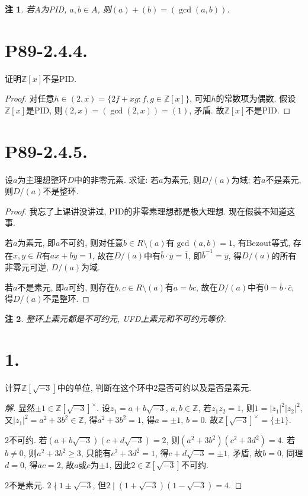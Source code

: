\documentclass[12pt, a4paper, fontset=windows]{ctexart}
\newcommand{\Z}{\mathbb{Z}}
\newcommand{\abs}[1]{\left|{#1}\right|}
\newcommand{\cl}[1]{\overline{#1}} %
\newcommand{\unit}[1]{{#1}^\times}
\newtheorem*{remark}{注}
\newenvironment{solution}{\begin{proof}[解]}{\end{proof}}
\begin{document}
\begin{remark}
若$A$为{\rm PID}, $a,b\in A$, 则$(a)+(b)=(\gcd(a,b))$. 
\end{remark}

\section*{P89-2.4.4.}

证明$\Z[x]$不是PID. 

\begin{proof}
对任意$h\in(2,x)=\{2f+xg:f,g\in\Z[x]\}$, 
可知$h$的常数项为偶数. 假设$\Z[x]$是PID, 
则$(2,x)=(\gcd(2,x))=(1)$, 矛盾. 故$\Z[x]$不是PID. 
\end{proof}

\section*{P89-2.4.5.}

设$a$为主理想整环$D$中的非零元素. 求证: 若$a$为素元, 
则$D/(a)$为域; 若$a$不是素元, 则$D/(a)$不是整环. 

\begin{proof}
我忘了上课讲没讲过, PID的非零素理想都是极大理想. 现在假装不知道这事. 

若$a$为素元, 即$a$不可约, 则对任意$b\in R\setminus(a)$有$\gcd(a,b)=1$, 
有Bezout等式, 存在$x,y\in R$有$ax+by=1$, 故在$D/(a)$中有$\cl{b}\cdot\cl{y}=\cl{1}$, 
即$\cl{b}^{-1}=\cl{y}$, 得$D/(a)$的所有非零元可逆, $D/(a)$为域. 

若$a$不是素元, 即$a$可约, 则存在$b,c\in R\setminus(a)$有$a=bc$, 
故在$D/(a)$中有$\cl{0}=\cl{b}\cdot\cl{c}$, 得$D/(a)$不是整环. 
\end{proof}

\begin{remark}
整环上素元都是不可约元, {\rm UFD}上素元和不可约元等价. 
\end{remark}

\section*{1.}

计算$\Z[\sqrt{-3}]$中的单位, 判断在这个环中$2$是否可约以及是否是素元. 

\begin{solution}
显然$\pm 1\in\unit{\Z[\sqrt{-3}]}$. 设$z_1=a+b\sqrt{-3}$, 
$a,b\in\Z$, 若$z_1z_2=1$, 则$1=\abs{z_1}^2\abs{z_2}^2$, 
又$\abs{z_1}^2=a^2+3b^2\in\Z$, 得$a^2+3b^2=1$, 
得$a=\pm 1$, $b=0$. 故$\unit{\Z[\sqrt{-3}]}=\{\pm 1\}$. 

$2$不可约. 若$(a+b\sqrt{-3})(c+d\sqrt{-3})=2$, 
则$(a^2+3b^2)(c^2+3d^2)=4$. 若$b\ne 0$, 则$a^2+3b^2\ge 3$, 
只能有$c^2+3d^2=1$, 得$c+d\sqrt{-3}=\pm 1$, 矛盾, 
故$b=0$, 同理$d=0$, 得$ac=2$, 故$a$或$c$为$\pm 1$, 
因此$2\in\Z[\sqrt{-3}]$不可约. 

$2$不是素元. $2\nmid 1\pm\sqrt{-3}$, 
但$2\mid (1+\sqrt{-3})(1-\sqrt{-3})=4$. 
\end{solution}
\end{document}

